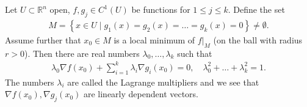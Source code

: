 \begin{theorem}\label{thm:lagrange-multiplier}
	Let $U \subset \mathbb{R}^{n}$ open, $f, g_{j} \in C^{1}(U)$ be functions for $1 \leq j \leq k$. Define the set
	\begin{align*}
		M = \left\{ x \in U \mid g_{1}(x) = g_{2}(x) = \dots = g_{k}(x) = 0 \right\} \neq \emptyset.
	\end{align*}
	Assume further that $x_{0} \in M$ is a local minimum of $f |_{M}$ (on the ball with radius $r > 0$). Then there are real numbers $\lambda_{0}, \dots, \lambda_{k}$ such that
	\begin{align*}
		\lambda_{0} \nabla f(x_{0}) +\sum_{i=1}^{k} \lambda_{i} \nabla g_{i} (x_{0}) = 0, \quad \lambda_{0}^{2} + \dots + \lambda_{k}^{2} = 1.
	\end{align*}
	The numbers $\lambda_{i}$ are called the Lagrange multipliers and we see that $\nabla f(x_{0}), \nabla g_{j}(x_{0})$ are linearly dependent vectors.
\end{theorem}
